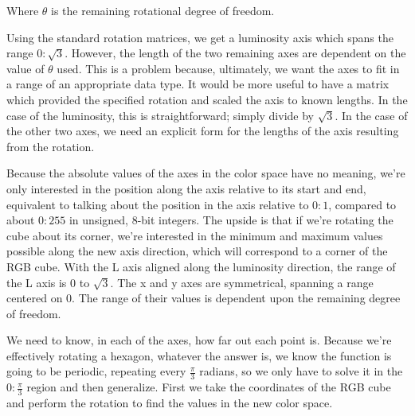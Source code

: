 Where $\theta$ is the remaining rotational degree of freedom.

Using the standard rotation matrices, we get a luminosity axis which spans the range $0:\sqrt{3}$. However, the length of the two remaining axes are dependent on the value of $\theta$ used. This is a problem because, ultimately, we want the axes to fit in a range of an appropriate data type. It would be more useful to have a matrix which provided the specified rotation and scaled the axis to known lengths. In the case of the luminosity, this is straightforward; simply divide by $\sqrt{3}$. In the case of the other two axes, we need an explicit form for the lengths of the axis resulting from the rotation.

Because the absolute values of the axes in the color space have no meaning, we're only interested in the position along the axis relative to its start and end, equivalent to talking about the position in the axis relative to $0:1$, compared to about $0:255$ in unsigned, 8-bit integers. The upside is that if we're rotating the cube about its corner, we're interested in the minimum and maximum values possible along the new axis direction, which will correspond to a corner of the RGB cube. With the L axis aligned along the luminosity direction, the range of the L axis is 0 to $\sqrt{3}$. The x and y axes are symmetrical, spanning a range centered on 0. The range of their values is dependent upon the remaining degree of freedom.

We need to know, in each of the axes, how far out each point is. Because we're effectively rotating a hexagon, whatever the answer is, we know the function is going to be periodic, repeating every $\frac{\pi}{3}$ radians, so we only have to solve it in the $0:\frac{\pi}{3}$ region and then generalize. First we take the coordinates of the RGB cube and perform the rotation to find the values in the new color space.



